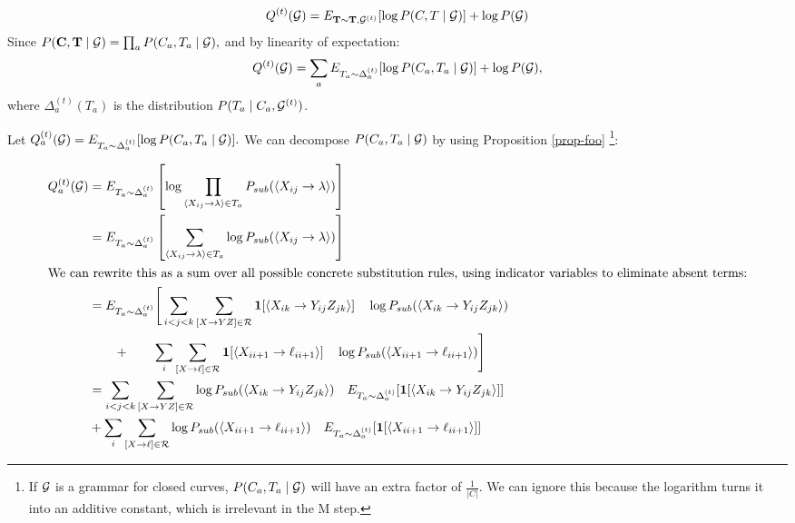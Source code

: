 \documentclass{article}
\def\ind{\mathbf{1}}
\begin{document}
$$Q^{(t)}({\mathcal G}) = E_{\mathbf{T}\sim \mathbf{T}, {\mathcal G}^{(t)}} [\log
P(C,T\mid {\mathcal G})] + \log P({\mathcal G})$$
Since $P(\mathbf{C},\mathbf{T}\mid {\mathcal G}) = \prod_a P(C_a, T_a\mid {\mathcal G}),$
and by linearity of expectation:
$$Q^{(t)}({\mathcal G}) = \sum_a E_{T_a\sim \Delta^{(t)}_a} [\log
P(C_a,T_a \mid {\mathcal G})] + \log P({\mathcal G}),$$
where $\Delta^{(t)}_a(T_a)$ is the distribution $P(T_a\mid C_a,
{\mathcal G}^{(t)})$.

Let $Q_a^{(t)}({\mathcal G}) =E_{T_a \sim \Delta_a^{(t)}}[\log P(C_a,T_a\mid
{\mathcal G})].$ We can decompose $P(C_a, T_a\mid {\mathcal G})$ by using Proposition
\ref{prop-foo} \footnote{If ${\mathcal G}$ is a grammar for closed curves,
  $P(C_a,T_a\mid {\mathcal G})$ will have an extra factor of
  $\frac{1}{|C|}$. We can ignore this because the logarithm turns it
  into an additive constant, which is irrelevant in the M step.}:

\begin{align*}
  Q_a^{(t)}(\GGG) &=
E_{T_a \sim \Delta_a^{(t)}}\left[\log
    \prod_{\langle X_{ij} \to \lambda\rangle \in T_a} P_{sub}(\langle
    X_{ij} \to \lambda\rangle)\right]\\
&=
E_{T_a \sim \Delta_a^{(t)}}\left[
    \sum_{\langle X_{ij} \to \lambda\rangle \in T_a} \log P_{sub}(\langle
    X_{ij} \to \lambda\rangle)\right]\\
\intertext{We can rewrite this as a sum over all possible concrete
  substitution rules, using indicator variables to eliminate absent terms:}
&=
E_{T_a \sim \Delta_a^{(t)}}\Bigg[
\sum_{i < j < k} \sum_{[X\to YZ]\in \RRR}\ind [ 
\langle X_{ik}
\to Y_{ij} Z_{jk} \rangle] \quad \log P_{sub}(\langle X_{ik} \to Y_{ij}
Z_{jk}\rangle )\\
&\qquad+\qquad \sum_{i} \sum_{[X\to \ell]\in \RRR}\ind [ \langle X_{i i+1}
\to \ell_{i i+1} \rangle] \quad \log P_{sub}(\langle X_{i i+1} \to \ell_{i i+1}\rangle)
\Bigg]\\
&=
\sum_{i < j < k} \sum_{[X\to YZ]\in \RRR} \log P_{sub}(\langle X_{ik} \to Y_{ij}
Z_{jk}\rangle ) \quad E_{T_a \sim \Delta_a^{(t)}}[\ind [ 
\langle X_{ik}
\to Y_{ij} Z_{jk} \rangle]]\\
&+ \sum_{i} \sum_{[X\to \ell]\in \RRR}
\log P_{sub}(\langle X_{i i+1} \to \ell_{i i+1}\rangle)
\quad E_{T_a \sim \Delta_a^{(t)}}[\ind [ \langle X_{i i+1}
\to \ell_{i i+1} \rangle]] 
\end{align*}
\end{document}
